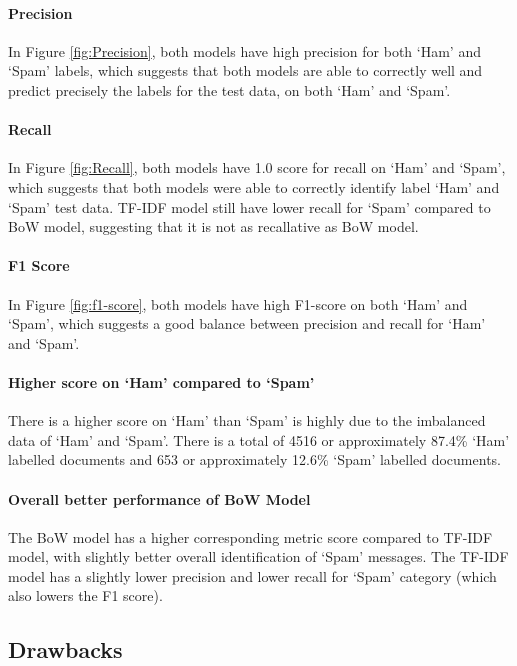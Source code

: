 \paragraph{Precision}
In Figure \ref{fig:Precision}, both models have high precision for both `Ham' and `Spam' labels, which suggests that both models are able to correctly well and  predict precisely the labels for the test data, on both `Ham' and `Spam'.

\paragraph{Recall}
In Figure \ref{fig:Recall}, both models have 1.0 score for recall on `Ham' and `Spam', which suggests that both models were able to correctly identify label `Ham'  and `Spam' test data.
TF-IDF model still have lower recall for `Spam' compared to BoW model, suggesting that it is not as recallative as BoW model. 

\paragraph{F1 Score}
In Figure \ref{fig:f1-score}, both models have high F1-score on both `Ham' and `Spam', which suggests a good balance between precision and recall for `Ham' and `Spam'.

\paragraph{Higher score on `Ham' compared to `Spam'}
There is a higher score on `Ham' than `Spam' is highly due to the imbalanced data of `Ham' and `Spam'.
There is a total of 4516 or approximately 87.4\% `Ham' labelled documents and 653 or approximately 12.6\% `Spam' labelled documents.

\paragraph{Overall better performance of BoW Model}
The BoW model has a higher corresponding metric score compared to TF-IDF model, with slightly better overall identification of `Spam' messages.
The TF-IDF model has a slightly lower precision and lower recall for `Spam' category (which also lowers the F1 score).





\subsection{Drawbacks}

